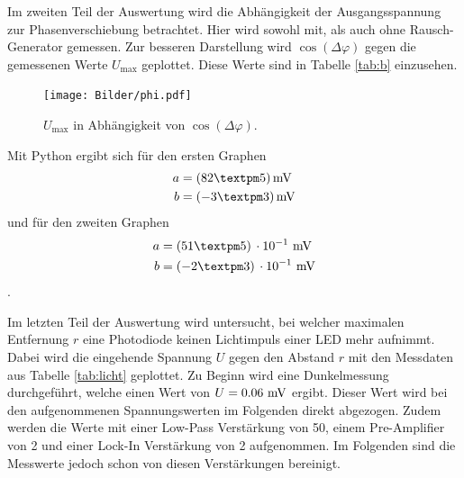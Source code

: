 \newpage

Im zweiten Teil der Auswertung wird die Abhängigkeit der Ausgangsspannung zur Phasenverschiebung
betrachtet. Hier wird sowohl mit, als auch ohne Rausch-Generator gemessen. Zur besseren
Darstellung wird $\cos{(\Delta\varphi)}$ gegen die gemessenen Werte $U_\text{max}$
geplottet. Diese Werte sind in Tabelle \ref{tab:b} einzusehen.

\begin{figure}[H]
  \centering
  \texttt{[image: Bilder/phi.pdf]}
  \caption{$U_\text{max}$ in Abhängigkeit von $\cos{(\Delta\varphi)}$.}
  \label{fig:Umax}
\end{figure}
Mit Python ergibt sich für den ersten Graphen
\begin{align*}
  a &= (82 ± 5) \mV   \\
  b &= (-3 ± 3) \mV
\end{align*}
und für den zweiten Graphen
\begin{align*}
  a &= (51 ± 5) \,\cdot 10^{-1} \, \mV      \\
  b &= (-2 ± 3) \,\cdot 10^{-1} \, \mV
\end{align*}.

\newpage


Im letzten Teil der Auswertung wird untersucht, bei welcher maximalen Entfernung $r$
eine Photodiode keinen Lichtimpuls einer LED mehr aufnimmt. Dabei wird die eingehende Spannung $U$
gegen den Abstand $r$ mit den Messdaten aus Tabelle \ref{tab:licht} geplottet.
Zu Beginn wird eine Dunkelmessung durchgeführt, welche einen Wert von $U = 0.06 \,\,\si{\milli\volt}$
ergibt. Dieser Wert wird bei den aufgenommenen Spannungswerten im Folgenden direkt
abgezogen. Zudem werden die Werte mit einer Low-Pass Verstärkung von 50, einem
Pre-Amplifier von 2 und einer Lock-In Verstärkung von 2 aufgenommen. Im Folgenden
sind die Messwerte jedoch schon von diesen Verstärkungen bereinigt.

